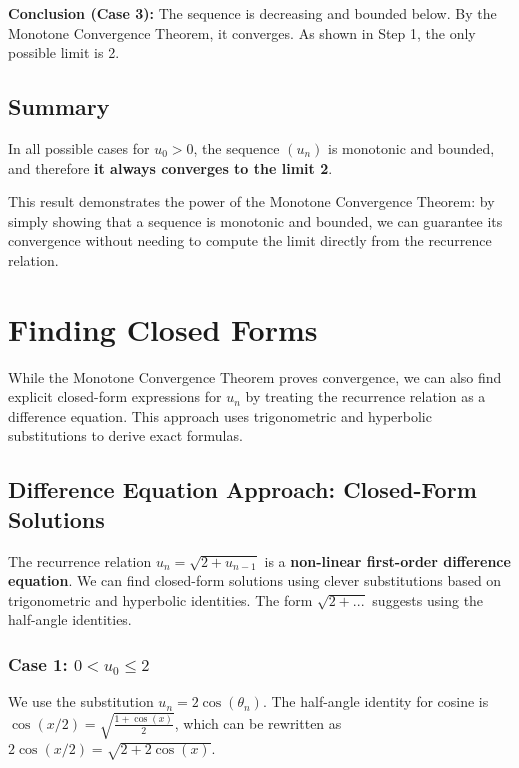 \documentclass[12pt,a4paper]{article}
\theoremstyle{definition}
\begin{document}
\textbf{Conclusion (Case 3):} The sequence is decreasing and bounded below. By the Monotone Convergence Theorem, it converges. As shown in Step 1, the only possible limit is 2.

\subsection{Summary}

In all possible cases for $u_0 > 0$, the sequence $(u_n)$ is monotonic and bounded, and therefore \textbf{it always converges to the limit 2}.

This result demonstrates the power of the Monotone Convergence Theorem: by simply showing that a sequence is monotonic and bounded, we can guarantee its convergence without needing to compute the limit directly from the recurrence relation.

\section{Finding Closed Forms}

While the Monotone Convergence Theorem proves convergence, we can also find explicit closed-form expressions for $u_n$ by treating the recurrence relation as a difference equation. This approach uses trigonometric and hyperbolic substitutions to derive exact formulas.

\subsection{Difference Equation Approach: Closed-Form Solutions}

The recurrence relation $u_n = \sqrt{2 + u_{n-1}}$ is a \textbf{non-linear first-order difference equation}. We can find closed-form solutions using clever substitutions based on trigonometric and hyperbolic identities. The form $\sqrt{2 + ...}$ suggests using the half-angle identities.

\subsubsection{Case 1: $0 < u_0 \le 2$}

We use the substitution \textbf{$u_n = 2\cos(\theta_n)$}. The half-angle identity for cosine is $\cos(x/2) = \sqrt{\frac{1 + \cos(x)}{2}}$, which can be rewritten as $2\cos(x/2) = \sqrt{2 + 2\cos(x)}$.
\end{document}
